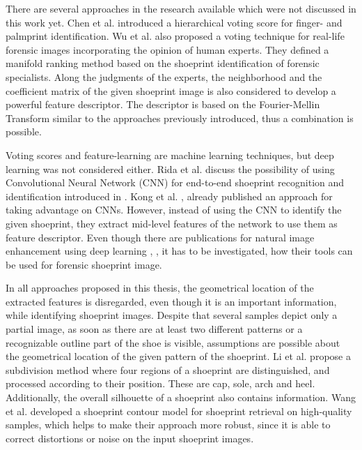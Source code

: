 \documentclass[draft,final]{vutinfth} %
\begin{document}
\par
There are several approaches in the research available which were not discussed in this work yet.
Chen et al. \cite{chen2013hierarchical} introduced a hierarchical voting score for finger- and palmprint identification.
Wu et al. \cite{wu2019losgsr} also proposed a voting technique for real-life forensic images incorporating the opinion of human experts.
They defined a manifold ranking method based on the shoeprint identification of forensic specialists.
Along the judgments of the experts, the neighborhood and the coefficient matrix of the given shoeprint image is also considered to develop a powerful feature descriptor.
The descriptor is based on the Fourier-Mellin Transform similar to the approaches previously introduced, thus a combination is possible.
\par
Voting scores and feature-learning are machine learning techniques, but deep learning \cite{lecun2015deep} was not considered either.
Rida et al. \cite{rida2019forensic} discuss the possibility of using Convolutional Neural Network (CNN) for end-to-end shoeprint recognition and identification introduced in \cite{lecun1998gradient}.
Kong et al. \cite{kong2017cross}, \cite{kong2019cross} already published an approach for taking advantage on CNNs.
However, instead of using the CNN to identify the given shoeprint, they extract mid-level features of the network to use them as feature descriptor.
Even though there are publications for natural image enhancement using deep learning \cite{gharbi2017deep}, \cite{chen2018deep}, it has to be investigated, how their tools can be used for forensic shoeprint image.
\par
In all approaches proposed in this thesis, the geometrical location of the extracted features is disregarded, even though it is an important information, while identifying shoeprint images.
Despite that several samples depict only a partial image, as soon as there are at least two different patterns or a recognizable outline part of the shoe is visible, assumptions are possible about the geometrical location of the given pattern of the shoeprint.
Li et al. \cite{li2015secondary} propose a subdivision method where four regions of a shoeprint are distinguished, and processed according to their position.
These are cap, sole, arch and heel.
Additionally, the overall silhouette of a shoeprint also contains information.
Wang et al. \cite{wang2014automatic} developed a shoeprint contour model for shoeprint retrieval on high-quality samples, which helps to make their approach more robust, since it is able to correct distortions or noise on the input shoeprint images.
\end{document}
